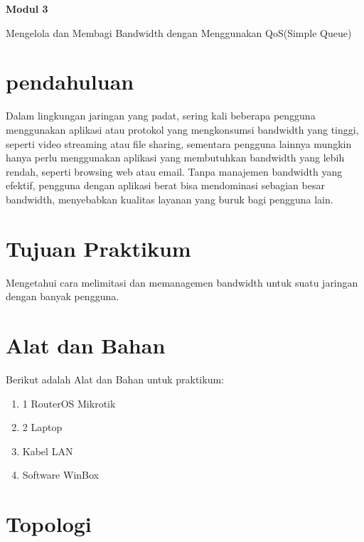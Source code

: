 \newpage
\setcounter{section}{0}
\renewcommand{\thesection}{\arabic{section}}

\begin{center}
    \Huge
    \textbf{Modul 3}
    
    Mengelola dan Membagi Bandwidth dengan Menggunakan QoS(Simple Queue) 

\end{center}


\section{pendahuluan}

Dalam lingkungan jaringan yang padat, sering kali beberapa pengguna menggunakan aplikasi atau protokol yang mengkonsumsi bandwidth yang tinggi, seperti video streaming atau file sharing, sementara pengguna lainnya mungkin hanya perlu menggunakan aplikasi yang membutuhkan bandwidth yang lebih rendah, seperti browsing web atau email. Tanpa manajemen bandwidth yang efektif, pengguna dengan aplikasi berat bisa mendominasi sebagian besar bandwidth, menyebabkan kualitas layanan yang buruk bagi pengguna lain.

\section{Tujuan Praktikum}

Mengetahui cara melimitasi dan memanagemen bandwidth untuk suatu jaringan dengan banyak pengguna.

\section{Alat dan Bahan}

Berikut adalah Alat dan Bahan untuk praktikum:
\begin{enumerate}
    \item 1 RouterOS Mikrotik
    \item 2 Laptop
    \item Kabel LAN 
    \item Software WinBox
\end{enumerate}

\section{Topologi}


